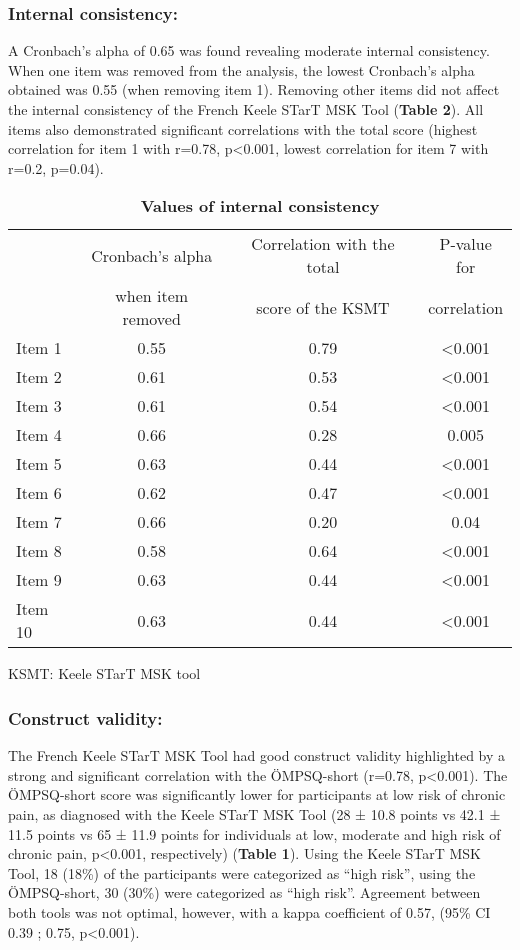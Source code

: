 \subsubsection{Internal consistency: }
A Cronbach’s alpha of 0.65 was found revealing moderate internal consistency. When one item was removed from the analysis, the lowest Cronbach’s alpha obtained was 0.55 (when removing item 1). Removing other items did not affect the internal consistency of the French Keele STarT MSK Tool (\textbf{Table 2}). All items also demonstrated significant correlations with the total score (highest correlation for item 1 with r=0.78, p<0.001, lowest correlation for item 7 with r=0.2, p=0.04). 

\begin{table}[ht]
\addtolength{\tabcolsep}{-3pt}
\caption{\bf Values of internal consistency }
\begin{tabular}{l c c c }
\hline
 &  Cronbach’s alpha &	Correlation with the total &	P-value for\\
 & when item removed & score of the KSMT & correlation \\
\hline
Item 1 & 0.55 & 0.79 & <0.001\\
Item 2&0.61&0.53&<0.001\\
Item 3&0.61&0.54&<0.001\\
Item 4&0.66&0.28&0.005\\
Item 5&0.63&0.44&<0.001\\
Item 6&0.62&0.47&<0.001\\
Item 7&0.66&0.20&0.04\\
Item 8&0.58&0.64&<0.001\\
Item 9&0.63&0.44&<0.001\\
Item 10&0.63&0.44&<0.001\\
\hline
\end{tabular}
KSMT: Keele STarT MSK tool
\end{table}

\subsubsection{Construct validity: }
The French Keele STarT MSK Tool had good construct validity highlighted by a strong and significant correlation with the ÖMPSQ-short (r=0.78, p<0.001). The ÖMPSQ-short score was significantly lower for participants at low risk of chronic pain, as diagnosed with the Keele STarT MSK Tool (28 ± 10.8 points vs 42.1 ± 11.5 points vs 65 ± 11.9 points for individuals at low, moderate and high risk of chronic pain, p<0.001, respectively) (\textbf{Table 1}). Using the Keele STarT MSK Tool, 18 (18\%) of the participants were categorized as “high risk”, using the ÖMPSQ-short, 30 (30\%) were categorized as “high risk”. Agreement between both tools was not optimal, however, with a kappa coefficient of 0.57, (95\% CI 0.39 ; 0.75, p<0.001). 

